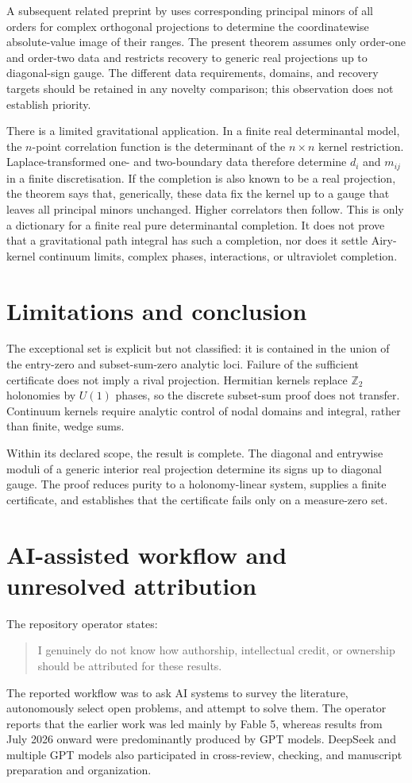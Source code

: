\documentclass[11pt,a4paper]{article}
\theoremstyle{definition}
\theoremstyle{remark}
\begin{document}
A subsequent related preprint by \citet{Villacis2026} uses corresponding principal
minors of all orders for complex orthogonal projections to determine the coordinatewise
absolute-value image of their ranges. The present theorem assumes only order-one and
order-two data and restricts recovery to generic real projections up to diagonal-sign
gauge. The different data requirements, domains, and recovery targets should be retained
in any novelty comparison; this observation does not establish priority.

There is a limited gravitational application.  In a finite real determinantal model, the
$n$-point correlation function is the determinant of the $n\times n$ kernel restriction.
Laplace-transformed one- and two-boundary data therefore determine $d_i$ and $m_{ij}$ in a
finite discretisation.  If the completion is also known to be a real projection, the
theorem says that, generically, these data fix the kernel up to a gauge that leaves all
principal minors unchanged.  Higher correlators then follow.  This is only a dictionary
for a finite real pure determinantal completion.  It does not prove that a gravitational
path integral has such a completion, nor does it settle Airy-kernel continuum limits,
complex phases, interactions, or ultraviolet completion.

\section{Limitations and conclusion}

The exceptional set is explicit but not classified: it is contained in the union of the
entry-zero and subset-sum-zero analytic loci.  Failure of the sufficient certificate does
not imply a rival projection.  Hermitian kernels replace $\mathbb Z_2$ holonomies by
$U(1)$ phases, so the discrete subset-sum proof does not transfer.  Continuum kernels
require analytic control of nodal domains and integral, rather than finite, wedge sums.

Within its declared scope, the result is complete.  The diagonal and entrywise moduli of a
generic interior real projection determine its signs up to diagonal gauge.  The proof
reduces purity to a holonomy-linear system, supplies a finite certificate, and establishes
that the certificate fails only on a measure-zero set.

\section*{AI-assisted workflow and unresolved attribution}
The repository operator states:
\begin{quote}
I genuinely do not know how authorship, intellectual credit, or ownership should be attributed for these results.
\end{quote}
The reported workflow was to ask AI systems to survey the literature,
autonomously select open problems, and attempt to solve them. The operator
reports that the earlier work was led mainly by Fable 5, whereas results from
July 2026 onward were predominantly produced by GPT models. DeepSeek and
multiple GPT models also participated in cross-review, checking, and
manuscript preparation and organization.
\end{document}
